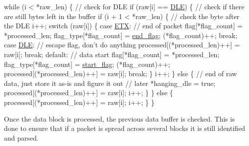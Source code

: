\begin{DoxyCodeInclude}
  \textcolor{keywordflow}{while} (i < *raw\_len) \{
    \textcolor{comment}{// check for DLE}
    \textcolor{keywordflow}{if} (raw[i] == \hyperlink{tsip__read_8h_add7018db64fb17dd1e4664b4494be0ee}{DLE}) \{
      \textcolor{comment}{// check if there are still bytes left in the buffer}
      \textcolor{keywordflow}{if} (i + 1 < *raw\_len) \{
        \textcolor{comment}{// check the byte after the DLE}
        i++;
        \textcolor{keywordflow}{switch} (raw[i]) \{
        \textcolor{keywordflow}{case} \hyperlink{tsip__read_8h_af02558e983dd26832a852bf186ed6726}{ETX}:
          \textcolor{comment}{// end of packet}
          flag[*flag\_count] = *processed\_len;
          flag\_type[*flag\_count] = \hyperlink{tsip__decode_8h_aaadb960acba914ffc497ac7b256cdd55a5ed0c9e4189b86c84f9ded0501e9dd18}{end\_flag};
          (*flag\_count)++;
          \textcolor{keywordflow}{break};
        \textcolor{keywordflow}{case} \hyperlink{tsip__read_8h_add7018db64fb17dd1e4664b4494be0ee}{DLE}:
          \textcolor{comment}{// escape flag, don't do anything}
          processed[(*processed\_len)++] = raw[i];
          \textcolor{keywordflow}{break};
        \textcolor{keywordflow}{default}:
          \textcolor{comment}{// data start}
          flag[*flag\_count] = *processed\_len;
          flag\_type[*flag\_count] = \hyperlink{tsip__decode_8h_aaadb960acba914ffc497ac7b256cdd55a4b507f9b9a7feb19dc7248d7de612717}{start\_flag};
          (*flag\_count)++;
          processed[(*processed\_len)++] = raw[i];
          \textcolor{keywordflow}{break};
        \}
        i++;
      \} \textcolor{keywordflow}{else} \{
        \textcolor{comment}{// end of raw data, just store it as-is and figure it out}
        \textcolor{comment}{// later}
        *hanging\_dle = \textcolor{keyword}{true};
        processed[(*processed\_len)++] = raw[i];
        i++;
      \}
    \} \textcolor{keywordflow}{else} \{
      processed[(*processed\_len)++] = raw[i];
      i++;
    \}
  \}
\end{DoxyCodeInclude}
 Once the data block is processed, the previous data buffer is checked. This is done to ensure that if a packet is spread across several blocks it is still identified and parsed.


